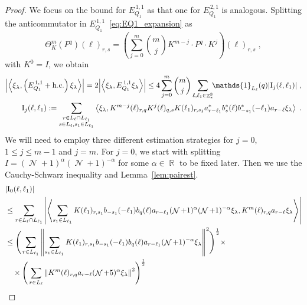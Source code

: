 \documentclass[12pt,a4paper]{article}
\numberwithin{equation}{section}
\newcommand{\1}{\mathbb{I}}
\newcommand{\I}{\mathrm{I}}
\DeclareMathOperator{\R}{\mathbb{R}}
\DeclareMathOperator{\Z}{\mathbb{Z}}
\DeclareMathOperator{\NN}{\mathcal{N}}
\newcommand{\half}{\frac{1}{2}}
\newcommand{\eva}[1]{\left\langle #1 \right\rangle}
\theoremstyle{plain}
\theoremstyle{definition}
\theoremstyle{remark}
\theoremstyle{plain}
\theoremstyle{definition}
\theoremstyle{remark}
\begin{document}
\begin{proof}
We focus on the bound for $ E^{\,1,1}_{Q_1} $ as that one for $ E^{\,2,1}_{Q_1} $ is analogous. Splitting the anticommutator in $ E^{\,1,1}_{Q_1} $~\eqref{eq:EQ1_expansion} as
\begin{equation} \label{eq:q-q}
	\Theta^m_K(P^q)(\ell)_{r,s}
	= \left(\sum\limits_{j=0}^m {{m}\choose j} K^{m-j} \cdot P^q \cdot K^{j}\right)(\ell)_{r,s} \;,
\end{equation}
with $ K^0 = I $, we obtain
\begin{equation} \label{eq:EQ1111}
\begin{aligned}
	\abs{\eva{\xi_\lambda,\left(E^{\,1,1}_{Q_1}+\mathrm{h.c.}\right) \xi_\lambda }} 
	= 2\abs{\eva{\xi_\lambda, E^{\,1,1}_{Q_1} \xi_\lambda }}
	\le 4 \sum_{j=0}^m {{m}\choose j} \sum\limits_{\ell,\ell_1  \in \Z^3_*}\!\! \mathds{1}_{L_\ell}(q) |\I_j(\ell, \ell_1)| \;,\\
	\I_j(\ell, \ell_1)
	:= \sum\limits_{\substack{r\in L_{\ell} \cap L_{\ell_1}\\ s \in L_{\ell},s_1\in L_{\ell_1}}}
		\eva{\xi_\lambda, K^{m-j}(\ell)_{r,q} K^{j}(\ell)_{q,s} K(\ell_1)_{r,s_1} a^*_{r-\ell_1} b^*_{s}(\ell) b^*_{-s_1}(-\ell_1) a_{r-\ell} \xi_\lambda} \;. \\
\end{aligned}
\end{equation}
We will need to employ three different estimation strategies for $ j = 0 $, $ 1 \le j \le m-1 $ and $ j = m $. For $ j = 0 $, we start with splitting $I = (\NN+1)^{\alpha}(\NN+1)^{-\alpha}$ for some $\alpha \in \R$ to be fixed later. Then we use the Cauchy-Schwarz inequality and Lemma~\ref{lem:pairest}.
\begin{align}
	&|\I_0(\ell, \ell_1)| \nonumber\\
    &\le \sum\limits_{r \in L_\ell \cap L_{\ell_1}} \abs{\eva{ \sum\limits_{s_1 \in L_{\ell_1}} K(\ell_1)_{r,s_1} b_{-s_1}(-\ell_1) b_{q}(\ell) a_{r-\ell_1} (\NN+1)^{\alpha} (\NN+1)^{-\alpha} \xi_\lambda,  K^{m}(\ell)_{r,q} a_{r-\ell} \xi_\lambda }}\nonumber\\
    &\leq \Bigg( \sum\limits_{r \in L_{\ell_1}} \norm{\sum\limits_{s_1 \in L_{\ell_1}} K(\ell_1)_{r,s_1} b_{-s_1}(-\ell_1) b_{q}(\ell) a_{r-\ell_1} (\NN+1)^{-\alpha}\xi_\lambda}^2\Bigg)^\half \times\nonumber\\
    &\quad \times \Bigg( \sum\limits_{r \in L_\ell}  \norm{  K^{m}(\ell)_{r,q}  a_{r-\ell} (\NN+5)^{\alpha}\xi_\lambda }^2\Bigg)^\half \nonumber\\

\end{align}
\end{proof}
\end{document}
